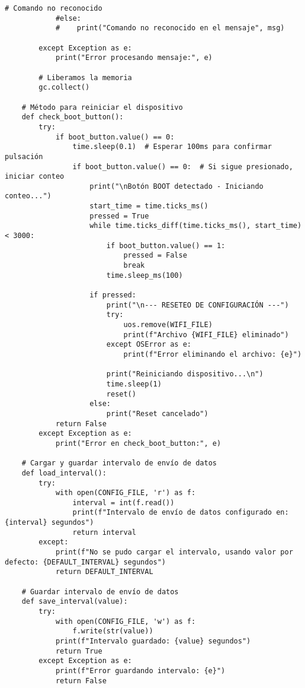 \begin{lstlisting}[label=cod:firmware,caption=Firmware nodo sensor de consumos. , language=PythonUTF8]
            # Comando no reconocido
            #else:
            #    print("Comando no reconocido en el mensaje", msg)
                    
        except Exception as e:
            print("Error procesando mensaje:", e)
            
        # Liberamos la memoria
        gc.collect()
    
    # Método para reiniciar el dispositivo 
    def check_boot_button():
        try:
            if boot_button.value() == 0:  
                time.sleep(0.1)  # Esperar 100ms para confirmar pulsación
                if boot_button.value() == 0:  # Si sigue presionado, iniciar conteo
                    print("\nBotón BOOT detectado - Iniciando conteo...")
                    start_time = time.ticks_ms()
                    pressed = True
                    while time.ticks_diff(time.ticks_ms(), start_time) < 3000:
                        if boot_button.value() == 1:
                            pressed = False
                            break
                        time.sleep_ms(100)
                    
                    if pressed:
                        print("\n--- RESETEO DE CONFIGURACIÓN ---")
                        try:
                            uos.remove(WIFI_FILE)
                            print(f"Archivo {WIFI_FILE} eliminado")
                        except OSError as e:
                            print(f"Error eliminando el archivo: {e}")
                        
                        print("Reiniciando dispositivo...\n")
                        time.sleep(1)
                        reset()
                    else:
                        print("Reset cancelado")
            return False
        except Exception as e:
            print("Error en check_boot_button:", e)
            
    # Cargar y guardar intervalo de envío de datos
    def load_interval():
        try:
            with open(CONFIG_FILE, 'r') as f:
                interval = int(f.read())
                print(f"Intervalo de envío de datos configurado en: {interval} segundos")
                return interval
        except:
            print(f"No se pudo cargar el intervalo, usando valor por defecto: {DEFAULT_INTERVAL} segundos")
            return DEFAULT_INTERVAL
    
    # Guardar intervalo de envío de datos
    def save_interval(value):
        try:
            with open(CONFIG_FILE, 'w') as f:
                f.write(str(value))
            print(f"Intervalo guardado: {value} segundos")
            return True
        except Exception as e:
            print(f"Error guardando intervalo: {e}")
            return False
    

\end{lstlisting}
